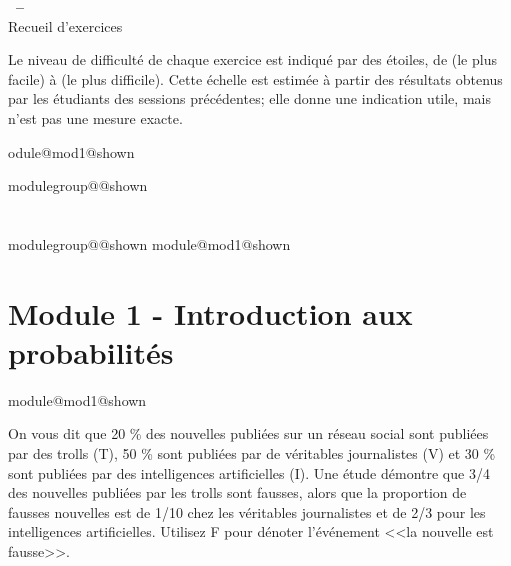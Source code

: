 \documentclass{Evaluation}
\makeatletter
\newcommand{\currentmodulekey}{}
\newcommand{\currentmoduletitle}{}
\newcommand{\currentgroupkey}{}
\newcommand{\currentgrouptitle}{}
\newcommand{\moduleheader}[2]{%
  \renewcommand{\currentmodulekey}{#1}%
  \renewcommand{\currentmoduletitle}{#2}%
  \expandafter\global\expandafter\let\csname module@#1@shown\endcsname\relax
}
\newcommand{\showmoduleifneeded}{%
  \ifx\currentgroupkey\empty\else
    \expandafter\ifx\csname modulegroup@\currentgroupkey @shown\endcsname\relax
      \section*{\currentgrouptitle}%
      \expandafter\gdef\csname modulegroup@\currentgroupkey @shown\endcsname{1}%
    \fi
  \fi
  \expandafter\ifx\csname module@\currentmodulekey @shown\endcsname\relax
    \section*{\currentmoduletitle}%
    \expandafter\gdef\csname module@\currentmodulekey @shown\endcsname{1}%
  \fi
}
\newenvironment{A25}{\showmoduleifneeded}{}
\makeatother
\begin{document}
\begin{center}
  {\Large\textbf{\SigleNumero\ -- \NomCours}}\\[0.3cm]
  {\large Recueil d'exercices}
\end{center}
\medskip

\noindent\small Le niveau de difficulté de chaque exercice est indiqué par des étoiles, de  (le plus facile) à  (le plus difficile). Cette échelle est estimée à partir des résultats obtenus par les étudiants des sessions précédentes; elle donne une indication utile, mais n'est pas une mesure exacte.
\normalsize
\medskip

\begin{questions}


\moduleheader{mod1}{Module 1 - Introduction aux probabilités}

\begin{A25}
\question {} %
On vous dit que 20 \% des nouvelles publiées sur un réseau social sont publiées par des trolls (T), 50 \% sont publiées par de véritables journalistes (V)
et 30 \% sont publiées par des intelligences artificielles (I). Une étude démontre que 3/4 des nouvelles publiées par les trolls sont fausses, alors que
la proportion de fausses nouvelles est de 1/10 chez les véritables journalistes et de 2/3 pour les intelligences artificielles.
Utilisez F pour dénoter l'événement <<la nouvelle est fausse>>.

\end{A25}
\end{questions}
\end{document}
